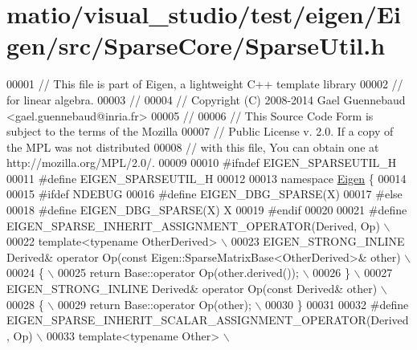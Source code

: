 \hypertarget{matio_2visual__studio_2test_2eigen_2_eigen_2src_2_sparse_core_2_sparse_util_8h_source}{}\section{matio/visual\+\_\+studio/test/eigen/\+Eigen/src/\+Sparse\+Core/\+Sparse\+Util.h}
\label{matio_2visual__studio_2test_2eigen_2_eigen_2src_2_sparse_core_2_sparse_util_8h_source}

\begin{DoxyCode}
00001 \textcolor{comment}{// This file is part of Eigen, a lightweight C++ template library}
00002 \textcolor{comment}{// for linear algebra.}
00003 \textcolor{comment}{//}
00004 \textcolor{comment}{// Copyright (C) 2008-2014 Gael Guennebaud <gael.guennebaud@inria.fr>}
00005 \textcolor{comment}{//}
00006 \textcolor{comment}{// This Source Code Form is subject to the terms of the Mozilla}
00007 \textcolor{comment}{// Public License v. 2.0. If a copy of the MPL was not distributed}
00008 \textcolor{comment}{// with this file, You can obtain one at http://mozilla.org/MPL/2.0/.}
00009 
00010 \textcolor{preprocessor}{#ifndef EIGEN\_SPARSEUTIL\_H}
00011 \textcolor{preprocessor}{#define EIGEN\_SPARSEUTIL\_H}
00012 
00013 \textcolor{keyword}{namespace }\hyperlink{namespace_eigen}{Eigen} \{ 
00014 
00015 \textcolor{preprocessor}{#ifdef NDEBUG}
00016 \textcolor{preprocessor}{#define EIGEN\_DBG\_SPARSE(X)}
00017 \textcolor{preprocessor}{#else}
00018 \textcolor{preprocessor}{#define EIGEN\_DBG\_SPARSE(X) X}
00019 \textcolor{preprocessor}{#endif}
00020 
00021 \textcolor{preprocessor}{#define EIGEN\_SPARSE\_INHERIT\_ASSIGNMENT\_OPERATOR(Derived, Op) \(\backslash\)}
00022 \textcolor{preprocessor}{template<typename OtherDerived> \(\backslash\)}
00023 \textcolor{preprocessor}{EIGEN\_STRONG\_INLINE Derived& operator Op(const Eigen::SparseMatrixBase<OtherDerived>& other) \(\backslash\)}
00024 \textcolor{preprocessor}{\{ \(\backslash\)}
00025 \textcolor{preprocessor}{  return Base::operator Op(other.derived()); \(\backslash\)}
00026 \textcolor{preprocessor}{\} \(\backslash\)}
00027 \textcolor{preprocessor}{EIGEN\_STRONG\_INLINE Derived& operator Op(const Derived& other) \(\backslash\)}
00028 \textcolor{preprocessor}{\{ \(\backslash\)}
00029 \textcolor{preprocessor}{  return Base::operator Op(other); \(\backslash\)}
00030 \textcolor{preprocessor}{\}}
00031 
00032 \textcolor{preprocessor}{#define EIGEN\_SPARSE\_INHERIT\_SCALAR\_ASSIGNMENT\_OPERATOR(Derived, Op) \(\backslash\)}
00033 \textcolor{preprocessor}{template<typename Other> \(\backslash\)}

\end{DoxyCode}
